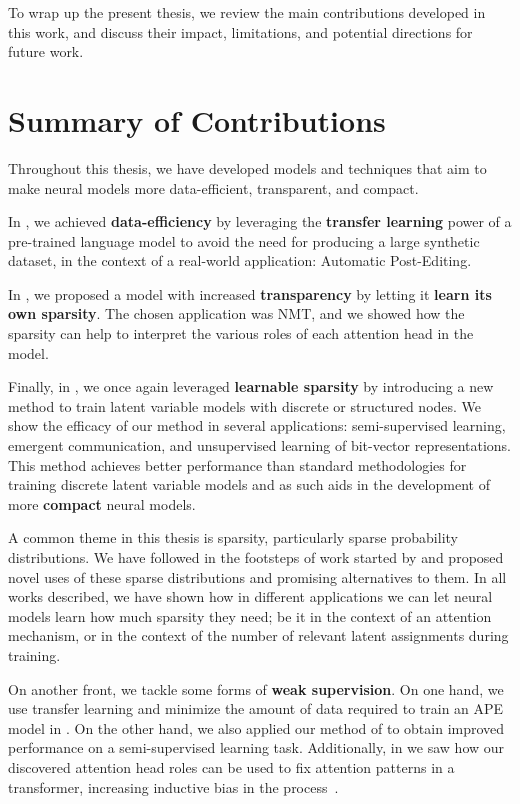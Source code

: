 \label{chap:conclusions}

\cleardoublepage
\doublespacing

\noindent To wrap up the present thesis, we review the main contributions
developed in this work, and discuss their impact, limitations, and
potential directions for future work.

\section{Summary of Contributions}

\noindent Throughout this thesis, we have developed models and
techniques that aim to make neural models more data-efficient, transparent,
and compact.

In , we achieved \textbf{data-efficiency} by
leveraging the \textbf{transfer learning} power of a pre-trained
language model to avoid the need for producing a large synthetic
dataset, in the context of a real-world application: Automatic
Post-Editing.

In , we proposed a model with increased
\textbf{transparency} by letting it \textbf{learn its own sparsity}.
The chosen application was NMT, and we showed
how the sparsity can help to interpret the various roles of each
attention head in the model.

Finally, in , we once again leveraged
\textbf{learnable sparsity} by introducing a new method to train
latent variable models with discrete or structured nodes. We show the
efficacy of our method in several applications: semi-supervised
learning, emergent communication, and unsupervised learning of
bit-vector representations. This method achieves better performance
than standard methodologies for training discrete latent variable
models and as such aids in the development of more \textbf{compact}
neural models.

A common theme in this thesis is sparsity, particularly
sparse probability distributions. We have followed in the footsteps
of work started by \citet{sparsemax} and proposed novel uses of
these sparse distributions and promising alternatives to them.
In all works described, we have shown how in different applications
we can let neural models learn how much sparsity they need; be it
in the context of an attention mechanism, or in the context of
the number of relevant latent assignments during training.

On another front, we tackle some forms of \textbf{weak supervision}.
On one hand, we use transfer learning and minimize the amount of data
required to train an APE model in . On the other
hand, we also applied our method of  to
obtain improved performance on a semi-supervised learning task.
Additionally, in  we saw how our
discovered attention head roles can be used to fix attention patterns
in a transformer, increasing inductive bias in the
process~\citep{raganato2020FixedEncoderSelfAttentiona}.

